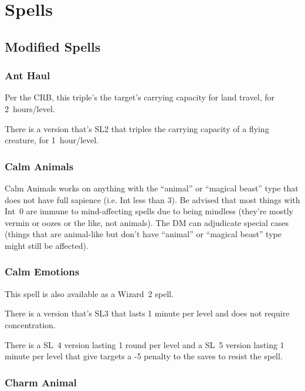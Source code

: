 
\chapter{Spells}
\label{sect-spells}

%
%
\section{Modified Spells}

%
\subsection{Ant Haul}

Per the CRB, this triple's the target's carrying capacity for land travel,
for 2~hours/level.

There is a version that's SL2 that triples the carrying capacity of a
flying creature, for 1~hour/level.
%

%
\subsection{Calm Animals}

Calm Animals works on anything with the ``animal'' or ``magical beast''
type that does not have full sapience (i.e. Int less than 3). Be advised
that most things with Int~0 are immune to mind-affecting spells due to
being mindless (they're mostly vermin or oozes or the like, not animals).
The DM can adjudicate special cases (things that are animal-like but don't
have ``animal'' or ``magical beast'' type might still be affected).
%

%
\subsection{Calm Emotions}

This spell is also available as a Wizard~2 spell.

There is a version that's SL3 that lasts 1 minute per level and does not
require concentration.

There is a SL~4 version lasting 1 round per level and a SL~5 version
lasting 1 minute per level that give targets a -5 penalty to the saves to
resist the spell.
%

%
\subsection{Charm Animal}

